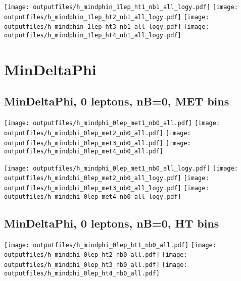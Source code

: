 \documentclass[11pt]{article}
\begin{document}
    \noindent
     \texttt{[image: outputfiles/h\_mindphin\_1lep\_ht1\_nb1\_all\_logy.pdf]}
     \texttt{[image: outputfiles/h\_mindphin\_1lep\_ht2\_nb1\_all\_logy.pdf]}
     \texttt{[image: outputfiles/h\_mindphin\_1lep\_ht3\_nb1\_all\_logy.pdf]}
     \texttt{[image: outputfiles/h\_mindphin\_1lep\_ht4\_nb1\_all\_logy.pdf]}

    \clearpage








    \section{ MinDeltaPhi }

    \subsection{ MinDeltaPhi, 0 leptons, nB=0, MET bins }

    \noindent
     \texttt{[image: outputfiles/h\_mindphi\_0lep\_met1\_nb0\_all.pdf]}
     \texttt{[image: outputfiles/h\_mindphi\_0lep\_met2\_nb0\_all.pdf]}
     \texttt{[image: outputfiles/h\_mindphi\_0lep\_met3\_nb0\_all.pdf]}
     \texttt{[image: outputfiles/h\_mindphi\_0lep\_met4\_nb0\_all.pdf]}

    \noindent
     \texttt{[image: outputfiles/h\_mindphi\_0lep\_met1\_nb0\_all\_logy.pdf]}
     \texttt{[image: outputfiles/h\_mindphi\_0lep\_met2\_nb0\_all\_logy.pdf]}
     \texttt{[image: outputfiles/h\_mindphi\_0lep\_met3\_nb0\_all\_logy.pdf]}
     \texttt{[image: outputfiles/h\_mindphi\_0lep\_met4\_nb0\_all\_logy.pdf]}

    \clearpage



    \subsection{ MinDeltaPhi, 0 leptons, nB=0, HT bins }

    \noindent
     \texttt{[image: outputfiles/h\_mindphi\_0lep\_ht1\_nb0\_all.pdf]}
     \texttt{[image: outputfiles/h\_mindphi\_0lep\_ht2\_nb0\_all.pdf]}
     \texttt{[image: outputfiles/h\_mindphi\_0lep\_ht3\_nb0\_all.pdf]}
     \texttt{[image: outputfiles/h\_mindphi\_0lep\_ht4\_nb0\_all.pdf]}
\end{document}
